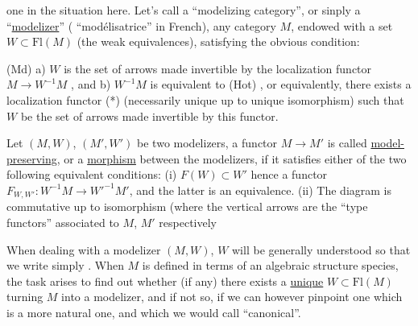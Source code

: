 one in the situation here. Let's call a ``modelizing category'', or sinply
a ``\uline{modelizer}'' ( ``modélisatrice'' in French), any category $M$, endowed with
a set $W\subset \mathrm{Fl}(M)$ (the weak equivalences), satisfying the obvious condition:

(Md) a) $W$ is the set of arrows made invertible by the localization
functor $M\to W^{-1}M$ , and
b) $W^{-1}M$ is equivalent to (Hot) ,
or equivalently, there exists a localization functor (*) (necessarily
unique up to unique isomorphism) such that $W$ be the set of arrows made
invertible by this functor.

Let $(M,W)$, $(M',W')$ be two modelizers, a functor  $M\to M'$ is called
\uline{model-preserving}, or a \uline{morphism} between the modelizers, if it satisfies
either of the two following equivalent conditions:
(i) $F(W)\subset W'$\hand{,} hence a functor $F_{W,W'} : W^{-1}M\to W'^{-1}M'$, and the latter
is an equivalence.
(ii) The diagram
is commutative up to isomorphism (where the vertical arrows
are the  ``type functors'' associated to $M$, $M'$ respectively\hand{)}

When dealing with a modelizer $(M,W)$, $W$ will be generally understood
so that we write simply . When $M$ is defined in terms of an algebraic
structure species, the task arises to find out whether (if any) there
exists a \uline{unique} $W\subset \mathrm{Fl}(M)$ turning $M$ into a modelizer, and if not so, if
we can however pinpoint one which is a more natural one, and which we
would call ``canonical''.

